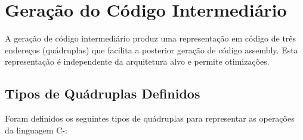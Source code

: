 \documentclass[
	12pt,				%
	oneside,
	a4paper,			%
	english,			%
	french,				%
	spanish,			%
	brazil,				%
	]{abntex2}
\begin{document}
\section{Geração do Código Intermediário}

A geração de código intermediário produz uma representação em código de três endereços (quádruplas) que facilita a posterior geração de código assembly. Esta representação é independente da arquitetura alvo e permite otimizações.

\subsection{Tipos de Quádruplas Definidos}

Foram definidos os seguintes tipos de quádruplas para representar as operações da linguagem C-:
\end{document}
